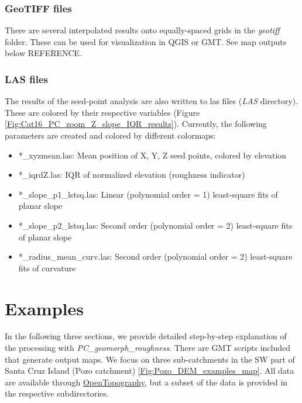 \documentclass[a4paperpaper,,tablecaptionabove]{scrartcl}
\providecommand{\tightlist}{%
  \setlength{\itemsep}{0pt}\setlength{\parskip}{0pt}}
\begin{document}
\hypertarget{geotiff-files}{%
\subsubsection{GeoTIFF files}\label{geotiff-files}}

There are several interpolated results onto equally-spaced grids in the
\emph{geotiff} folder. These can be used for visualization in QGIS or
GMT. See map outputs below REFERENCE.

\hypertarget{las-files}{%
\subsubsection{LAS files}\label{las-files}}

The results of the seed-point analysis are also written to las files
(\emph{LAS} directory). These are colored by their respective variables
(Figure \ref{Fig:Cat16_PC_zoom_Z_slope_IQR_results}). Currently, the
following parameters are created and colored by different colormaps:

\begin{itemize}
\tightlist
\item
  *\_xyzmean.las: Mean position of X, Y, Z seed points, colored by
  elevation
\item
  *\_iqrdZ.las: IQR of normalized elevation (roughness indicator)
\item
  *\_slope\_p1\_lstsq.las: Linear (polynomial order = 1) least-square
  fits of planar slope
\item
  *\_slope\_p2\_lstsq.las: Second order (polynomial order = 2)
  least-square fits of planar slope
\item
  *\_radius\_mean\_curv.las: Second order (polynomial order = 2)
  least-square fits of curvature
\end{itemize}

\hypertarget{examples}{%
\section{Examples}\label{examples}}

In the following three sections, we provide detailed step-by-step
explanation of the processing with \emph{PC\_geomorph\_roughness}. There
are GMT scripts included that generate output maps. We focus on three
sub-catchments in the SW part of Santa Cruz Island (Pozo catchment)
\ref{Fig:Pozo_DEM_examples_map}. All data are available through
\href{https://opentopography.org/}{OpenTopography}, but a subset of the
data is provided in the respective subdirectories.
\end{document}

